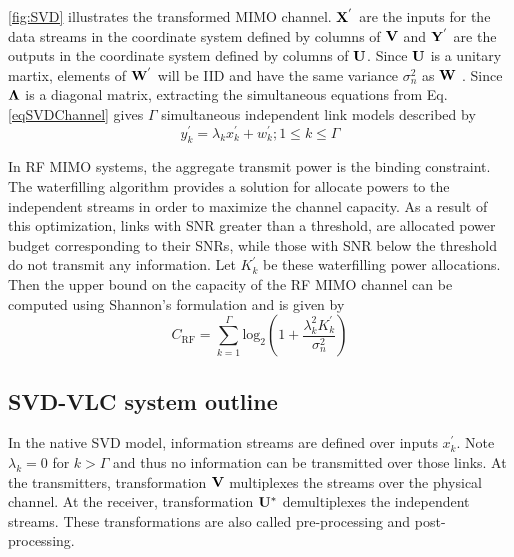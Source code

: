 \figurename{ {\ref{fig:SVD}}} illustrates the transformed MIMO channel. $\bf{X}^{'}$ are the inputs for the data streams in the coordinate system defined by columns of $\bf{V}$ and $\bf{Y}^{'}$ are the outputs in the coordinate system defined by columns of $\bf{U}$. Since $\bf{U}$ is a unitary martix, elements of $\bf{W}^{'}$ will be IID and have the same variance $\sigma_{n}^{2}$ as $\bf{W}$ \cite{tse05a}. Since $\bf{\Lambda}$ is a diagonal matrix, extracting the simultaneous equations from Eq. \eqref{eqSVDChannel} gives $\Gamma$ simultaneous independent link models described by
\begin{equation}
	\label{eqSVDChannel2}
	y^{'}_{k} = \lambda_{k}x^{'}_{k} + w^{'}_{k}; 1\leq{k}\leq\Gamma
\end{equation}

In RF MIMO systems, the aggregate transmit power is the binding constraint. The waterfilling algorithm \cite{gol97a} provides a solution for allocate powers to the independent streams in order to maximize the channel capacity. As a result of this optimization, links with SNR greater than a threshold, are allocated power budget corresponding to their SNRs, while those with SNR below the threshold do not transmit any information. Let ${K^{'}_{k}}$ be these waterfilling power allocations. Then the upper bound on the capacity of the RF MIMO channel can be computed using Shannon's formulation \cite{sha48a} and is given by
\begin{equation}
	\label{eqSVDCap}
	C_{\text{RF}} = \sum_{k=1}^{\Gamma}\text{log}^{ }_{2}\left(1 + \frac{\lambda_{k}^{2} {K}^{'}_{k}}{\sigma_{n}^{2}}\right)
\end{equation}

\subsection{SVD-VLC system outline}
\label{subsec:svdvlcSystem}
In the native SVD model, information streams are defined over inputs $x^{'}_{k}$. Note $\lambda_{k}=0$ for $k>\Gamma$ and thus no information can be transmitted over those links. At the transmitters, transformation $\bf{V}$ multiplexes the streams over the physical channel. At the receiver,  transformation $\bf{U}^{*}$ demultiplexes the independent streams. These transformations are also called pre-processing and post-processing.

